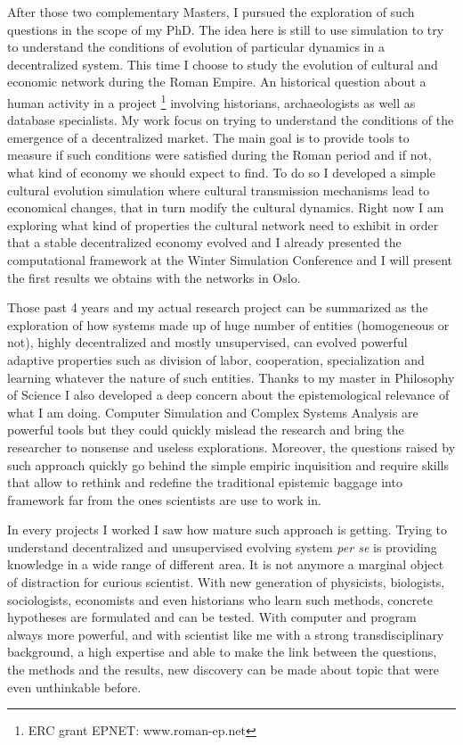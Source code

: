 \documentclass[10pt]{article}
\begin{document}
After those two complementary Masters, I pursued the exploration of such questions in the scope of my PhD. The idea here is still to use simulation to try to understand the conditions of evolution of particular dynamics in a decentralized system. This time I choose to study the evolution of cultural and economic network during the Roman Empire. An historical question about a human activity in a project \footnote{ERC grant EPNET: www.roman-ep.net} involving historians, archaeologists as well as database specialists. My work focus on trying to understand the conditions of the emergence of a decentralized market. The main goal is to provide tools to measure if such conditions were satisfied during the Roman period and if not, what kind of economy we should expect to find. To do so I developed a simple cultural evolution simulation where cultural transmission mechanisms lead to economical changes, that in turn modify the cultural dynamics. Right now I am exploring what kind of properties the cultural network need to exhibit in order that a stable decentralized economy evolved and I already presented the computational framework at the Winter Simulation Conference \cite{carrignon2015modelingthecoevolutionoftradeandcultureinpastsocieties} and I will present the first results we obtains with the networks in Oslo.

Those past 4 years and my actual research project can be summarized as the exploration of how systems made up of huge number of entities (homogeneous or not), highly decentralized and mostly unsupervised, can evolved powerful adaptive properties such as division of labor, cooperation, specialization and learning whatever the nature of such entities. Thanks to my master in Philosophy of Science I also developed a deep concern about the epistemological relevance of what I am doing. Computer Simulation and Complex Systems Analysis are powerful tools but they could quickly mislead the research and bring the researcher to nonsense and useless explorations. Moreover, the questions raised by such approach quickly go behind the simple empiric inquisition and require skills that allow to rethink and redefine the traditional epistemic baggage into framework far from the ones scientists are use to work in.


In every projects I worked I saw how mature such approach is getting. Trying to understand decentralized and unsupervised evolving system \emph{per se} is providing knowledge in a wide range of different area. It is not anymore a marginal object of distraction for curious scientist. With new generation of physicists, biologists, sociologists, economists and even historians who learn such methods, concrete hypotheses are formulated and can be tested. With computer and program always more powerful, and with scientist like me with a strong transdisciplinary background, a high expertise and able to make the link between the questions, the methods and the results, new discovery can be made about topic that were even unthinkable before. 
\end{document}
